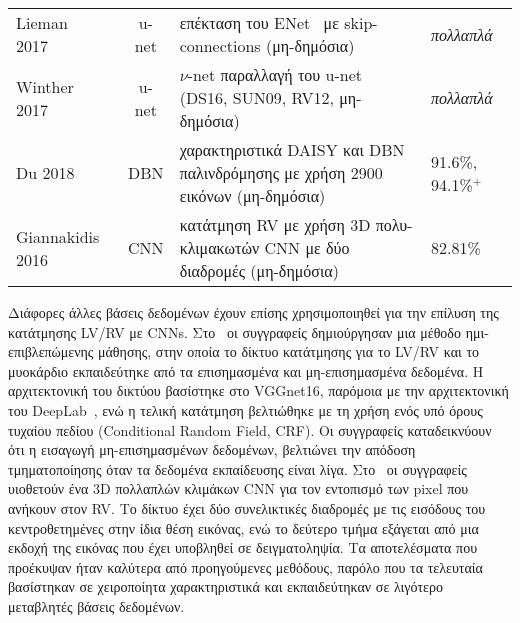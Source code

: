 \begin{sidewaystable}
\begin{tabular}{l c l l}
		Lieman 2017~\cite{lieman2017fastventricle}  & u-net           & επέκταση του ENet~\cite{paszke2016enet} με skip-connections (μη-δημόσια)                                    & \textit{πολλαπλά}                                                                                                                                                                                                                               \\
		Winther 2017~\cite{winther2017nu}           & u-net           & $\nu$-net παραλλαγή του u-net (DS16, SUN09, RV12, μη-δημόσια)                                              & \textit{πολλαπλά}                                                                                                                                                                                                                               \\
		Du 2018~\cite{du2018deep}                   & DBN             & χαρακτηριστικά DAISY και DBN παλινδρόμησης με χρήση 2900 εικόνων (μη-δημόσια)                              & 91.6\%, 94.1\%$^+$                                                                                                                                                                                                                              \\
		Giannakidis 2016~\cite{giannakidis2016fast} & CNN             & κατάτμηση RV με χρήση 3D πολυ-κλιμακωτών CNN με δύο διαδρομές (μη-δημόσια)                                 & 82.81\%                                                                                                                                                                                                                                         \\
		\bottomrule
	\end{tabular}
\end{sidewaystable}

Διάφορες άλλες βάσεις δεδομένων έχουν επίσης χρησιμοποιηθεί για την επίλυση της κατάτμησης LV/RV με CNNs.
Στο~\cite{bai2017semi} οι συγγραφείς δημιούργησαν μια μέθοδο ημι-επιβλεπώμενης μάθησης, στην οποία το δίκτυο κατάτμησης για το LV/RV και το μυοκάρδιο εκπαιδεύτηκε από τα επισημασμένα και μη-επισημασμένα δεδομένα.
Η αρχιτεκτονική του δικτύου βασίστηκε στο VGGnet16, παρόμοια με την αρχιτεκτονική του DeepLab~\cite{chen2018deeplab}, ενώ η τελική κατάτμηση βελτιώθηκε με τη χρήση ενός υπό όρους τυχαίου πεδίου (Conditional Random Field, CRF).
Οι συγγραφείς καταδεικνύουν ότι η εισαγωγή μη-επισημασμένων δεδομένων, βελτιώνει την απόδοση τμηματοποίησης όταν τα δεδομένα εκπαίδευσης είναι λίγα.
Στο~\cite{giannakidis2016fast} οι συγγραφείς υιοθετούν ένα 3D πολλαπλών κλιμάκων CNN για τον εντοπισμό των pixel που ανήκουν στον RV\@.
Το δίκτυο έχει δύο συνελικτικές διαδρομές με τις εισόδους του κεντροθετημένες στην ίδια θέση εικόνας, ενώ το δεύτερο τμήμα εξάγεται από μια εκδοχή της εικόνας που έχει υποβληθεί σε δειγματοληψία.
Τα αποτελέσματα που προέκυψαν ήταν καλύτερα από προηγούμενες μεθόδους, παρόλο που τα τελευταία βασίστηκαν σε χειροποίητα χαρακτηριστικά και εκπαιδεύτηκαν σε λιγότερο μεταβλητές βάσεις δεδομένων.

